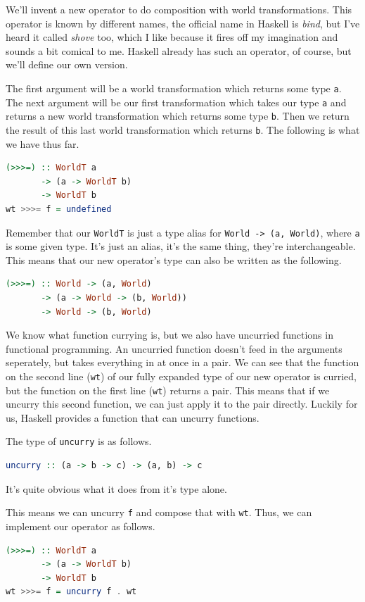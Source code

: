 \documentclass[11pt]{article}
\begin{document}
We'll invent a new operator to do composition with world transformations. This
operator is known by different names, the official name in Haskell is
\emph{bind}, but I've heard it called \emph{shove} too, which I like because it
fires off my imagination and sounds a bit comical to me. Haskell already has
such an operator, of course, but we'll define our own version.

The first argument will be a world transformation which returns some type
\texttt{a}. The next argument will be our first transformation which takes our
type \texttt{a} and returns a new world transformation which returns some type
\texttt{b}. Then we return the result of this last world transformation which
returns \texttt{b}. The following is what we have thus far.

\begin{lstlisting}[language=Haskell]
(>>>=) :: WorldT a
       -> (a -> WorldT b)
       -> WorldT b
wt >>>= f = undefined
\end{lstlisting}

Remember that our \texttt{WorldT} is just a type alias for \texttt{World -> (a,
World)}, where \texttt{a} is some given type. It's just an alias, it's the same
thing, they're interchangeable. This means that our new operator's type can
also be written as the following.
\begin{lstlisting}[language=Haskell]
(>>>=) :: World -> (a, World)
       -> (a -> World -> (b, World))
       -> World -> (b, World)
\end{lstlisting}

We know what function currying is, but we also have uncurried functions in
functional programming. An uncurried function doesn't feed in the arguments
seperately, but takes everything in at once in a pair. We can see that the
function on the second line (\texttt{wt}) of our fully expanded type of our new
operator is curried, but the function on the first line (\texttt{wt}) returns a
pair. This means that if we uncurry this second function, we can just apply it
to the pair directly.  Luckily for us, Haskell provides a function that can
uncurry functions.

The type of \texttt{uncurry} is as follows.
\begin{lstlisting}[language=Haskell]
uncurry :: (a -> b -> c) -> (a, b) -> c
\end{lstlisting}
It's quite obvious what it does from it's type alone.

This means we can uncurry \texttt{f} and compose that with \texttt{wt}. Thus,
we can implement our operator as follows.
\begin{lstlisting}[language=Haskell]
(>>>=) :: WorldT a
       -> (a -> WorldT b)
       -> WorldT b
wt >>>= f = uncurry f . wt
\end{lstlisting}
\end{document}

